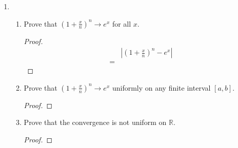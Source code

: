 \documentclass{article}
\begin{document}
\begin{enumerate}
\begin{proof}
                  \begin{align*}
                        \lvert f_n(x)-f(x)\rvert & = \left\lvert\frac{n(0)}{1+n^2(0)^2}-0\right\rvert \\
                                                 & = \left\lvert\frac{0}{1}\right\rvert               \\
                                                 & = \lvert0\rvert=0\leq\varepsilon
                  \end{align*}
                  and the following if $x\neq 0\implies x>0$:
                  \begin{align*}
                        \lvert f_n(x)-f(x)\rvert & = \left\lvert\frac{nx}{1+n^2x^2}-0\right\rvert \\
                                                 & < \frac{nx}{n^2x^2} = \frac{1}{nx}             \\
                                                 & < \frac{1}{Nx}                                 \\
                                                 & < \varepsilon
                  \end{align*}
                  Therefore, $f_n(x)$ converges pointwise. However, given any
                  $\varepsilon>0$, there exists some $x$ such that
                  $\frac{1}{Nx}\geq\varepsilon$. Therefore, $f_n(x)$ does not
                  converge uniformly.
            \end{proof}
            \setcounter{enumi}{13}
      \item \begin{enumerate}
                  \item Prove that $(1+\frac{x}{n})^n\to e^x$
                        for all $x$.
                        \begin{proof}
                              \begin{align*}
                                      & \left\lvert(1+\frac{x}{n})^n-e^x\right\rvert \\
                                    = &                                              %
                              \end{align*}
                        \end{proof}
                  \item Prove that $(1+\frac{x}{n})^n\to e^x$
                        uniformly on any finite interval $[a,b]$.
                        \begin{proof}
                        \end{proof}
                  \item Prove that the convergence is not
                        uniform on $\mathbb{R}$.
                        \begin{proof}
                        \end{proof}
            \end{enumerate}
\end{enumerate}
\end{document}
